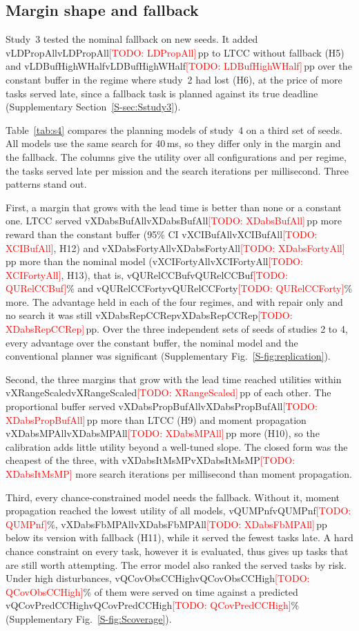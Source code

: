 \documentclass[a4paper,fleqn]{cas-dc}
\newcommand{\todo}[1]{\textcolor{red}{[TODO: #1]}}
\newcommand{\mname}{LTCC}  %
\newcommand{\val}[1]{\ifcsname v#1\endcsname\csname v#1\endcsname\else\todo{#1}\fi}
\newcounter{prop}
\begin{document}
\subsection{Margin shape and fallback}\label{sec:study3}\label{sec:study4}
Study~3 tested the nominal fallback on new seeds. It added \val{LDPropAll}\,pp to \mname{} without fallback (H5) and
\val{LDBufHighWHalf}\,pp over the constant buffer in the regime where study~2 had lost (H6), at the price of more tasks
served late, since a fallback task is planned against its true deadline (Supplementary Section~\ref{S-sec:Sstudy3}).

Table~\ref{tab:s4} compares the planning models of study~4 on a third set of seeds. All models use the same search for
40\,ms, so they differ only in the margin and the fallback. The columns give the utility over all configurations and
per regime, the tasks served late per mission and the search iterations per millisecond. Three patterns stand out.

First, a margin that grows with the lead time is better than none or a constant one. \mname{} served
\val{XDabsBufAll}\,pp more reward than the constant buffer (95\% CI \val{XCIBufAll}, H12) and \val{XDabsFortyAll}\,pp
more than the nominal model (\val{XCIFortyAll}, H13), that is, \val{QURelCCBuf}\% and \val{QURelCCForty}\% more. The
advantage held in each of the four regimes, and with repair only and no search it was still \val{XDabsRepCCRep}\,pp.
Over the three independent sets of seeds of studies 2 to 4, every advantage over the constant buffer, the nominal model
and the conventional planner was significant (Supplementary Fig.~\ref{S-fig:replication}).

Second, the three margins that grow with the lead time reached utilities within \val{XRangeScaled}\,pp of each other.
The proportional buffer served \val{XDabsPropBufAll}\,pp more than \mname{} (H9) and moment propagation
\val{XDabsMPAll}\,pp more (H10), so the calibration adds little utility beyond a well-tuned slope. The closed form was
the cheapest of the three, with \val{XDabsItMsMP} more search iterations per millisecond than moment propagation.

Third, every chance-constrained model needs the fallback. Without it, moment propagation reached the lowest utility of
all models, \val{QUMPnf}\%, \val{XDabsFbMPAll}\,pp below its version with fallback (H11), while it served the fewest
tasks late. A hard chance constraint on every task, however it is evaluated, thus gives up tasks that are still worth
attempting. The error model also ranked the served tasks by risk. Under high disturbances, \val{QCovObsCCHigh}\% of
them were served on time against a predicted \val{QCovPredCCHigh}\% (Supplementary Fig.~\ref{S-fig:Scoverage}).
\end{document}
